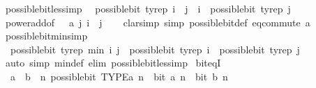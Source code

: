 \begin{isabellebody}
\endisatagproof
{\isafoldproof}%
%
\isadelimproof
\isanewline
%
\endisadelimproof
\isanewline
{}\isamarkupfalse%
\ possible{\isacharunderscore}{\kern0pt}bit{\isacharunderscore}{\kern0pt}less{\isacharunderscore}{\kern0pt}imp{\isacharcolon}{\kern0pt}\isanewline
\ \ {\isachardoublequoteopen}possible{\isacharunderscore}{\kern0pt}bit\ tyrep\ i\ {\isasymLongrightarrow}\ j\ {\isasymle}\ i\ {\isasymLongrightarrow}\ possible{\isacharunderscore}{\kern0pt}bit\ tyrep\ j{\isachardoublequoteclose}\isanewline
%
\isadelimproof
\ \ %
\endisadelimproof
%
\isatagproof
{}\isamarkupfalse%
\ power{\isacharunderscore}{\kern0pt}add{\isacharbrackleft}{\kern0pt}of\ {\isachardoublequoteopen}{}\ {\isacharcolon}{\kern0pt}{\isacharcolon}{\kern0pt}\ {\isacharprime}{\kern0pt}a{\isachardoublequoteclose}\ j\ {\isachardoublequoteopen}i\ {\isacharminus}{\kern0pt}\ j{\isachardoublequoteclose}{\isacharbrackright}{\kern0pt}\isanewline
\ \ \isamarkupfalse%
\ {\isacharparenleft}{\kern0pt}clarsimp\ simp{\isacharcolon}{\kern0pt}\ possible{\isacharunderscore}{\kern0pt}bit{\isacharunderscore}{\kern0pt}def\ eq{\isacharunderscore}{\kern0pt}commute{\isacharbrackleft}{\kern0pt}\ a{\isacharequal}{\kern0pt}{}{\isacharbrackright}{\kern0pt}{\isacharparenright}{\kern0pt}%
\endisatagproof
{\isafoldproof}%
%
\isadelimproof
\isanewline
%
\endisadelimproof
\isanewline
{}\isamarkupfalse%
\ possible{\isacharunderscore}{\kern0pt}bit{\isacharunderscore}{\kern0pt}min{\isacharbrackleft}{\kern0pt}simp{\isacharbrackright}{\kern0pt}{\isacharcolon}{\kern0pt}\isanewline
\ \ {\isachardoublequoteopen}possible{\isacharunderscore}{\kern0pt}bit\ tyrep\ {\isacharparenleft}{\kern0pt}min\ i\ j{\isacharparenright}{\kern0pt}\ {\isasymlongleftrightarrow}\ possible{\isacharunderscore}{\kern0pt}bit\ tyrep\ i\ {\isasymor}\ possible{\isacharunderscore}{\kern0pt}bit\ tyrep\ j{\isachardoublequoteclose}\isanewline
%
\isadelimproof
\ \ %
\endisadelimproof
%
\isatagproof
{}\isamarkupfalse%
\ {\isacharparenleft}{\kern0pt}auto\ simp{\isacharcolon}{\kern0pt}\ min{\isacharunderscore}{\kern0pt}def\ elim{\isacharcolon}{\kern0pt}\ possible{\isacharunderscore}{\kern0pt}bit{\isacharunderscore}{\kern0pt}less{\isacharunderscore}{\kern0pt}imp{\isacharparenright}{\kern0pt}%
\endisatagproof
{\isafoldproof}%
%
\isadelimproof
\isanewline
%
\endisadelimproof
\isanewline
{}\isamarkupfalse%
\ bit{\isacharunderscore}{\kern0pt}eqI{\isacharcolon}{\kern0pt}\isanewline
\ \ {\isacartoucheopen}a\ {\isacharequal}{\kern0pt}\ b{\isacartoucheclose}\ \ {\isacartoucheopen}{\isasymAnd}n{\isachardot}{\kern0pt}\ possible{\isacharunderscore}{\kern0pt}bit\ TYPE{\isacharparenleft}{\kern0pt}{\isacharprime}{\kern0pt}a{\isacharparenright}{\kern0pt}\ n\ {\isasymLongrightarrow}\ bit\ a\ n\ {\isasymlongleftrightarrow}\ bit\ b\ n{\isacartoucheclose}\isanewline

\end{isabellebody}
